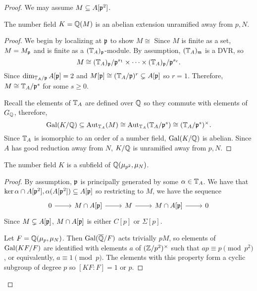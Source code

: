 \documentclass[thesis.tex]{subfiles}
\begin{document}
\begin{proof}
    We may assume $M\subseteq A[\mathfrak{p}^2]$.

    \begin{lemma}
        The number field $K=\mathbb{Q}(M)$ is an abelian extension unramified away from $p, N$.
    \end{lemma}
    \begin{proof}
        We begin by localizing at $\mathfrak{p}$ to show $M\cong $ Since $M$ is finite as a set, $M=M_{\mathfrak{p}}$ and is
        finite as a $(\mathbb{T}_A)_{\mathfrak{p}}$-module. By assumption, $(\mathbb{T}_A)_{\mathfrak{m}}$ is a DVR\@, so
        \[
            M\cong (\mathbb{T}_A)_{\mathfrak{p}} / \mathfrak{p}^{s_1} \times\cdots \times (\mathbb{T}_A)_{\mathfrak{p}} /
            \mathfrak{p}^{s_r}.
        \]
        Since $\dim_{\mathbb{T}_A/\mathfrak{p}} A[\mathfrak{p}]=2$ and $M[\mathfrak{p}]\cong (\mathbb{T}_A / \mathfrak{p})^r
        \subsetneq A[\mathfrak{p}]$ so $r=1$. Therefore, $M\cong \mathbb{T}_A/\mathfrak{p}^s$ for some
        $s\geq 0$.

        Recall the elements of $\mathbb{T}_A$ are defined over $\mathbb{Q}$ so they commute
        with elements of $G_{\mathbb{Q}}$, therefore,
        \[
            \operatorname{Gal}(K/\mathbb{Q})\subseteq \operatorname{Aut}_{\mathbb{T}_A} (M) \cong \operatorname{Aut}_{\mathbb{T}_A}
            (\mathbb{T}_A/\mathfrak{p}^s) \cong (\mathbb{T}_A/\mathfrak{p}^s)^\times.
        \]
        Since $\mathbb{T}_A$ is isomorphic to an order of a number field,
        $\operatorname{Gal}(K/\mathbb{Q})$ is abelian. Since $A$ has good reduction away from $N$,
        $K/\mathbb{Q}$ is unramified away from $p, N$.
    \end{proof}

    \begin{lemma}
        The number field $K$ is a subfield of $\mathbb{Q}(\mu_{p^2}, \mu_N)$.
    \end{lemma}
    \begin{proof}
        By assumption, $\mathfrak{p}$ is principally generated by some $\alpha\in \mathbb{T}_A$. We
        have that $\ker \alpha \cap A[\mathfrak{p}^2], \alpha(A[\mathfrak{p}^2]) \subseteq A[\mathfrak{p}]$ so
        restricting to $M$, we have the sequence
        \begin{equation}
            \label{eq:M_Ap}
            \begin{tikzcd}
                0 \arrow[r] &
                M\cap A[\p] \arrow[r] &
                M \arrow[r] &
                M\cap A[\p] \arrow[r] &
                0
            \end{tikzcd} 
        \end{equation}
        Since $M\subsetneq A[\mathfrak{p}]$, $M\cap A[\mathfrak{p}]$ is either $C[p]$ or
        $\Sigma[p]$. 

        Let $F=\mathbb{Q}(\mu_p, \mu_N)$. Then $\operatorname{Gal}(\overline{\mathbb{Q}}/F)$ acts trivially $pM$,
        so elements of $\operatorname{Gal}(KF/F)$ are identified with elements $a$ of 
        $(\mathbb{Z}/p^2)^\times$ such that $ap\equiv p \pmod{p^2}$, or equivalently,
        $a\equiv 1 \pmod{p}$. The elements with this property form a cyclic
        subgroup of degree $p$ so $[KF:F]=1$ or $p$.


\end{proof}
\end{proof}
\end{document}
